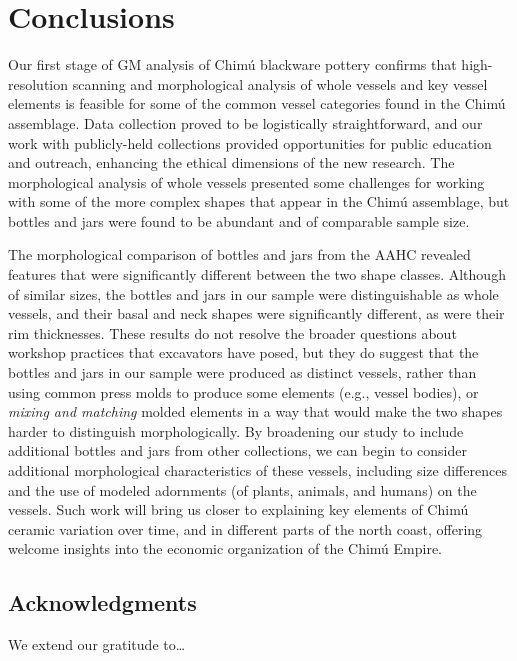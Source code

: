 \documentclass[]{interact}
\theoremstyle{plain}%
\theoremstyle{definition}
\theoremstyle{remark}
\begin{document}
\hypertarget{conclusions}{%
\section{Conclusions}\label{conclusions}}

Our first stage of GM analysis of Chimú blackware pottery confirms that
high-resolution scanning and morphological analysis of whole vessels and
key vessel elements is feasible for some of the common vessel categories
found in the Chimú assemblage. Data collection proved to be logistically
straightforward, and our work with publicly-held collections provided
opportunities for public education and outreach, enhancing the ethical
dimensions of the new research. The morphological analysis of whole
vessels presented some challenges for working with some of the more
complex shapes that appear in the Chimú assemblage, but bottles and jars
were found to be abundant and of comparable sample size.

The morphological comparison of bottles and jars from the AAHC revealed
features that were significantly different between the two shape
classes. Although of similar sizes, the bottles and jars in our sample
were distinguishable as whole vessels, and their basal and neck shapes
were significantly different, as were their rim thicknesses. These
results do not resolve the broader questions about workshop practices
that excavators have posed, but they do suggest that the bottles and
jars in our sample were produced as distinct vessels, rather than using
common press molds to produce some elements (e.g., vessel bodies), or
\emph{mixing and matching} molded elements in a way that would make the
two shapes harder to distinguish morphologically. By broadening our
study to include additional bottles and jars from other collections, we
can begin to consider additional morphological characteristics of these
vessels, including size differences and the use of modeled adornments
(of plants, animals, and humans) on the vessels. Such work will bring us
closer to explaining key elements of Chimú ceramic variation over time,
and in different parts of the north coast, offering welcome insights
into the economic organization of the Chimú Empire.

\hypertarget{acknowledgments}{%
\subsection{Acknowledgments}\label{acknowledgments}}

We extend our gratitude to\ldots{}
\end{document}
